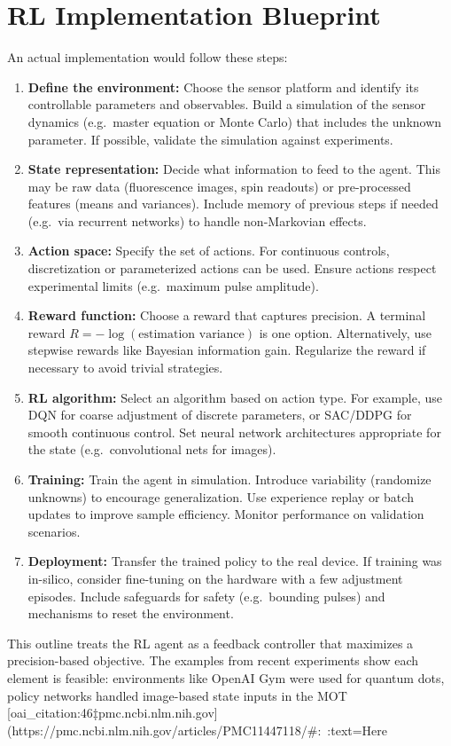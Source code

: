\documentclass[12pt]{article}
\begin{document}
\section{RL Implementation Blueprint}
An actual implementation would follow these steps:
\begin{enumerate}
  \item {\bf Define the environment:} Choose the sensor platform and identify its controllable parameters and observables.  Build a simulation of the sensor dynamics (e.g.\ master equation or Monte Carlo) that includes the unknown parameter. If possible, validate the simulation against experiments.
  \item {\bf State representation:} Decide what information to feed to the agent.  This may be raw data (fluorescence images, spin readouts) or pre-processed features (means and variances). Include memory of previous steps if needed (e.g.\ via recurrent networks) to handle non-Markovian effects.
  \item {\bf Action space:} Specify the set of actions.  For continuous controls, discretization or parameterized actions can be used.  Ensure actions respect experimental limits (e.g.\ maximum pulse amplitude). 
  \item {\bf Reward function:} Choose a reward that captures precision.  A terminal reward $R = -\log(\text{estimation variance})$ is one option.  Alternatively, use stepwise rewards like Bayesian information gain.  Regularize the reward if necessary to avoid trivial strategies.
  \item {\bf RL algorithm:} Select an algorithm based on action type.  For example, use DQN for coarse adjustment of discrete parameters, or SAC/DDPG for smooth continuous control.  Set neural network architectures appropriate for the state (e.g.\ convolutional nets for images).
  \item {\bf Training:} Train the agent in simulation.  Introduce variability (randomize unknowns) to encourage generalization.  Use experience replay or batch updates to improve sample efficiency.  Monitor performance on validation scenarios.
  \item {\bf Deployment:} Transfer the trained policy to the real device.  If training was in-silico, consider fine-tuning on the hardware with a few adjustment episodes.  Include safeguards for safety (e.g.\ bounding pulses) and mechanisms to reset the environment.
\end{enumerate}

This outline treats the RL agent as a feedback controller that maximizes a precision-based objective.  The examples from recent experiments show each element is feasible: environments like OpenAI Gym were used for quantum dots, policy networks handled image-based state inputs in the MOT [oai_citation:46‡pmc.ncbi.nlm.nih.gov](https://pmc.ncbi.nlm.nih.gov/articles/PMC11447118/#:~:text=Here%
\end{document}
